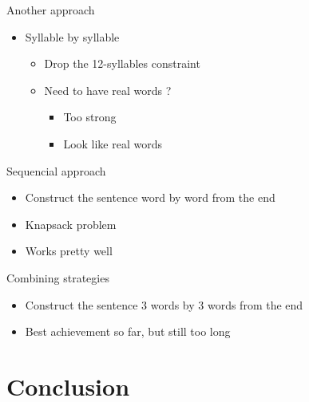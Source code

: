 \documentclass[unknownkeysallowed]{beamer}
\begin{document}
\begin{frame}[fragile]{Another approach}
\begin{itemize}
\item Syllable by syllable
\medskip

\begin{itemize}
\item Drop the 12-syllables constraint
\medskip

\item Need to have real words ? 
\medskip

\begin{itemize}
\item Too strong
\medskip

\item Look like real words
\end{itemize}
\end{itemize}
\end{itemize}
\end{frame}


\begin{frame}[fragile]{Sequencial approach}
\begin{itemize}
\item Construct the sentence word by word from the end
\medskip

\item Knapsack problem
\medskip

\item Works pretty well
\end{itemize}
\end{frame}


\begin{frame}[fragile]{Combining strategies}
\begin{itemize}
\item Construct the sentence 3 words by 3 words from the end
\medskip

\item Best achievement so far, but still too long
\end{itemize}
\end{frame}

\section{Conclusion}
\end{document}
